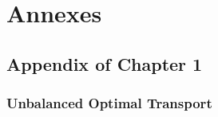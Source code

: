 \chapter[Annexes]{Annexes}

\renewcommand{\contentsname}{Contents}
\localtableofcontents



\section{Appendix of Chapter 1}

\subsection{Unbalanced Optimal Transport}


